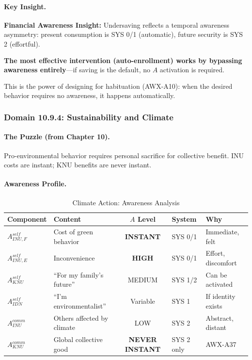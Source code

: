 \paragraph{Key Insight.}
\begin{tcolorbox}[colback=yellow!10!white, colframe=yellow!50!black]
\textbf{Financial Awareness Insight:}
Undersaving reflects a temporal awareness asymmetry: present consumption 
is SYS 0/1 (automatic), future security is SYS 2 (effortful).

\textbf{The most effective intervention (auto-enrollment) works by 
bypassing awareness entirely}---if saving is the default, no $A$ 
activation is required.

This is the power of designing for habituation (AWX-A10): when the desired 
behavior requires no awareness, it happens automatically.
\end{tcolorbox}

\subsubsection{Domain 10.9.4: Sustainability and Climate}
\label{subsubsec:awareness-climate}

\paragraph{The Puzzle (from Chapter 10).}
Pro-environmental behavior requires personal sacrifice for collective benefit.
INU costs are instant; KNU benefits are never instant.

\paragraph{Awareness Profile.}

\begin{table}[htbp]
\centering
\caption{Climate Action: Awareness Analysis}
\label{tab:climate-awareness-detailed}
\renewcommand{\arraystretch}{1.3}
\begin{tabular}{@{}llcll@{}}
\toprule
\textbf{Component} & \textbf{Content} & \textbf{$A$ Level} & \textbf{System} & \textbf{Why} \\
\midrule
$A^{self}_{INU,F}$ & Cost of green behavior & \textbf{INSTANT} & SYS 0/1 & Immediate, felt \\
$A^{self}_{INU,E}$ & Inconvenience & \textbf{HIGH} & SYS 0/1 & Effort, discomfort \\
$A^{self}_{KNU}$ & ``For my family's future'' & MEDIUM & SYS 1/2 & Can be activated \\
$A^{self}_{IDN}$ & ``I'm environmentalist'' & Variable & SYS 1 & If identity exists \\
$A^{comm}_{INU}$ & Others affected by climate & LOW & SYS 2 & Abstract, distant \\
$A^{comm}_{KNU}$ & Global collective good & \textbf{NEVER INSTANT} & SYS 2 only & AWX-A37 \\
\bottomrule
\end{tabular}
\end{table}

